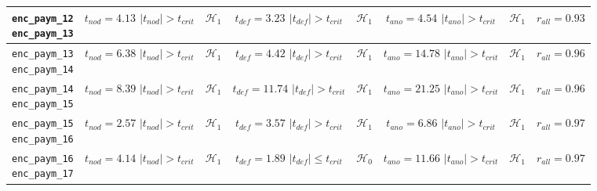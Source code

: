 \begin{table}[H]
{\begin{tabular}{|c|c|c|c|c|c|c|c|}
		\specialcell{\texttt{enc\_paym\_{12}}\\\texttt{enc\_paym\_{13}}} &
		\specialcell{$t_{nod} = 4.13$\\$|t_{nod}| > t_{crit}$} & $\mathcal{H}_1$ &
		\specialcell{$t_{def} = 3.23$\\$|t_{def}| > t_{crit}$} & $\mathcal{H}_1$ &
		\specialcell{$t_{ano} = 4.54$\\$|t_{ano}| > t_{crit}$} & $\mathcal{H}_1$ &
		$r_{all} = 0.93$ \\ \hline
		
		\specialcell{\texttt{enc\_paym\_{13}}\\\texttt{enc\_paym\_{14}}} &
		\specialcell{$t_{nod} = 6.38$\\$|t_{nod}| > t_{crit}$} & $\mathcal{H}_1$ &
		\specialcell{$t_{def} = 4.42$\\$|t_{def}| > t_{crit}$} & $\mathcal{H}_1$ &
		\specialcell{$t_{ano} = 14.78$\\$|t_{ano}| > t_{crit}$} & $\mathcal{H}_1$ &
		$r_{all} = 0.96$ \\ \hline
		
		\specialcell{\texttt{enc\_paym\_{14}}\\\texttt{enc\_paym\_{15}}} &
		\specialcell{$t_{nod} = 8.39$\\$|t_{nod}| > t_{crit}$} & $\mathcal{H}_1$ &
		\specialcell{$t_{def} = 11.74$\\$|t_{def}| > t_{crit}$} & $\mathcal{H}_1$ &
		\specialcell{$t_{ano} = 21.25$\\$|t_{ano}| > t_{crit}$} & $\mathcal{H}_1$ &
		$r_{all} = 0.96$ \\ \hline
		
		\specialcell{\texttt{enc\_paym\_{15}}\\\texttt{enc\_paym\_{16}}} &
		\specialcell{$t_{nod} = 2.57$\\$|t_{nod}| > t_{crit}$} & $\mathcal{H}_1$ &
		\specialcell{$t_{def} = 3.57$\\$|t_{def}| > t_{crit}$} & $\mathcal{H}_1$ &
		\specialcell{$t_{ano} = 6.86$\\$|t_{ano}| > t_{crit}$} & $\mathcal{H}_1$ &
		$r_{all} = 0.97$ \\ \hline
		
		\specialcell{\texttt{enc\_paym\_{16}}\\\texttt{enc\_paym\_{17}}} &
		\specialcell{$t_{nod} = 4.14$\\$|t_{nod}| > t_{crit}$} & $\mathcal{H}_1$ &
		\specialcell{$t_{def} = 1.89$\\$|t_{def}| \le t_{crit}$} & $\mathcal{H}_0$ &
		\specialcell{$t_{ano} = 11.66$\\$|t_{ano}| > t_{crit}$} & $\mathcal{H}_1$ &
		$r_{all} = 0.97$ \\ \hline
		

\end{tabular}}
\end{table}
